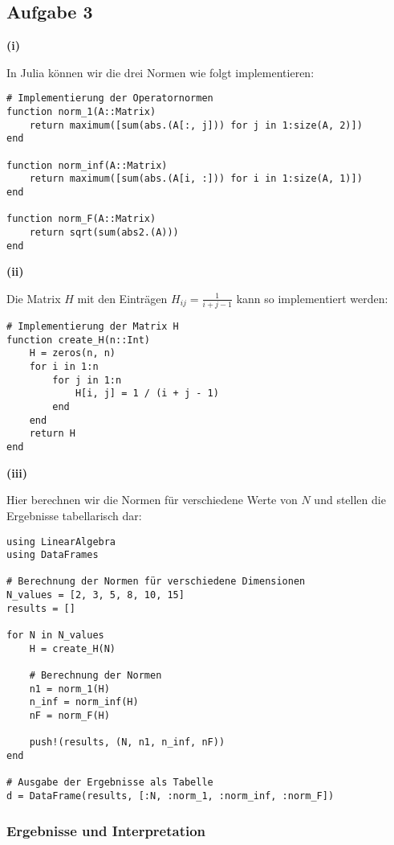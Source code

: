 \documentclass{article}
\begin{document}
\clearpage

\subsection*{Aufgabe 3}

\textbf{(i)}

In Julia können wir die drei Normen wie folgt implementieren:

\begin{verbatim}
# Implementierung der Operatornormen
function norm_1(A::Matrix)
    return maximum([sum(abs.(A[:, j])) for j in 1:size(A, 2)])
end

function norm_inf(A::Matrix)
    return maximum([sum(abs.(A[i, :])) for i in 1:size(A, 1)])
end

function norm_F(A::Matrix)
    return sqrt(sum(abs2.(A)))
end
\end{verbatim}

\textbf{(ii)}

Die Matrix $H$ mit den Einträgen $H_{ij} = \frac{1}{i+j-1}$ kann so implementiert werden:

\begin{verbatim}
# Implementierung der Matrix H
function create_H(n::Int)
    H = zeros(n, n)
    for i in 1:n
        for j in 1:n
            H[i, j] = 1 / (i + j - 1)
        end
    end
    return H
end
\end{verbatim}

\textbf{(iii)}

Hier berechnen wir die Normen für verschiedene Werte von $N$ und stellen die Ergebnisse tabellarisch dar:

\begin{verbatim}
using LinearAlgebra
using DataFrames

# Berechnung der Normen für verschiedene Dimensionen
N_values = [2, 3, 5, 8, 10, 15]
results = []

for N in N_values
    H = create_H(N)
    
    # Berechnung der Normen
    n1 = norm_1(H)
    n_inf = norm_inf(H)
    nF = norm_F(H)
    
    push!(results, (N, n1, n_inf, nF))
end

# Ausgabe der Ergebnisse als Tabelle
d = DataFrame(results, [:N, :norm_1, :norm_inf, :norm_F])
\end{verbatim}

\subsubsection*{Ergebnisse und Interpretation}
\end{document}
